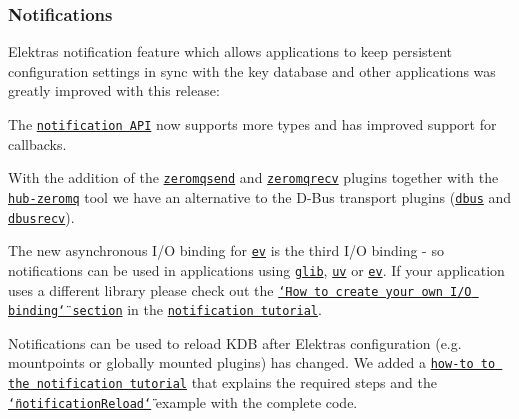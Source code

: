 \subsubsection*{Notifications}

Elektra\textquotesingle{}s notification feature which allows applications to keep persistent configuration settings in sync with the key database and other applications was greatly improved with this release\+:


\begin{DoxyItemize}
\item The \href{https://doc.libelektra.org/api/current/html/group__kdbnotification.html}{\tt notification A\+PI} now supports more types and has improved support for callbacks.
\item With the addition of the \href{https://www.libelektra.org/plugins/zeromqsend}{\tt zeromqsend} and \href{https://www.libelektra.org/plugins/zeromqrecv}{\tt zeromqrecv} plugins together with the \href{https://www.libelektra.org/tools/hub-zeromq}{\tt hub-\/zeromq} tool we have an alternative to the D-\/\+Bus transport plugins (\href{https://www.libelektra.org/plugins/dbus}{\tt dbus} and \href{https://www.libelektra.org/plugins/dbusrecv}{\tt dbusrecv}).
\item The new asynchronous I/O binding for \href{https://www.libelektra.org/bindings/io_ev}{\tt ev} is the third I/O binding -\/ so notifications can be used in applications using \href{https://www.libelektra.org/bindings/io_glib}{\tt glib}, \href{https://www.libelektra.org/bindings/io_uv}{\tt uv} or \href{https://www.libelektra.org/bindings/io_ev}{\tt ev}. If your application uses a different library please check out the \href{https://www.libelektra.org/tutorials/notifications#how-to-create-your-own-i-o-binding}{\tt \char`\"{}\+How to create your own I/\+O binding\char`\"{} section} in the \href{https://www.libelektra.org/tutorials/notifications}{\tt notification tutorial}.
\item Notifications can be used to reload K\+DB after Elektra\textquotesingle{}s configuration (e.\+g. mountpoints or globally mounted plugins) has changed. We added a \href{https://www.libelektra.org/tutorials/notifications#howto-reload-kdb-when-elektras-configuration-has-changed}{\tt how-\/to to the notification tutorial} that explains the required steps and the \href{https://www.libelektra.org/examples/notificationreload}{\tt \char`\"{}notification\+Reload\char`\"{}} example with the complete code.
\end{DoxyItemize}


